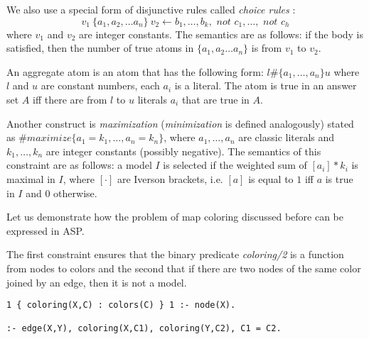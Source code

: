 We also use a special form of disjunctive rules called \textit{choice rules} \parencite{aspbook}:
\begin{equation*}
  v_1~\{ a_1, a_2, \dots a_n \}~v_2 \leftarrow b_1, \dots, b_k, \textit{ not }c_1,\dots,\textit{ not }c_h
\end{equation*}
where $v_1$ and $v_2$ are integer constants. The semantics are as follows: if the body is satisfied, then the number of true atoms in $\{ a_1, a_2 \dots a_n \}$ is from $v_1$ to $v_2$.

An aggregate atom is an atom that has the following form: $l \# \{ a_1, \dots ,a_n \} u$
where $l$ and $u$ are constant numbers, each $a_i$ is a literal. The atom is true in an answer set $A$ iff there are from $l$ to $u$ literals $a_i$ that are true in $A$.

Another construct is \textit{maximization} \parencite{aspbook, leone} (\textit{minimization} is defined analogously) stated as $\#\textit{maximize}\{ a_1=k_1, \dots, a_n=k_n \}$, 
where $a_1, \dots, a_n$ are classic literals and $k_1, \dots, k_n$ are integer constants (possibly negative). The semantics of this constraint are as follows: a model $I$ is selected if the weighted sum of $[a_i]*k_i$ is maximal in $I$, where $[\cdot]$ are Iverson brackets, i.e. $[a]$ is equal to $1$ iff $a$ is true in $I$ and $0$ otherwise.

\begin{example}
  Let us demonstrate how the problem of map coloring discussed before can be expressed in ASP. 

  The first constraint ensures that the binary predicate \textit{coloring/2} is a function from nodes to colors and the second that if there are two nodes of the same color joined by an edge, then it is not a model.
\begin{lstlisting}[caption=ASP encoding of map coloring constraints, label=lst:example_asp_coloring,basicstyle=\ttfamily]
1 { coloring(X,C) : colors(C) } 1 :- node(X).

:- edge(X,Y), coloring(X,C1), coloring(Y,C2), C1 = C2.
\end{lstlisting}
\end{example}


